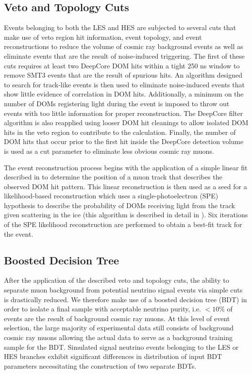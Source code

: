 \documentclass[manuscript]{aastex}
\begin{document}
\subsection{Veto and Topology Cuts}
Events belonging to both the LES and HES are subjected to several cuts that make use of veto region hit information, event topology, and event reconstructions to reduce the volume of cosmic ray background events as well as eliminate events that are the result of noise-induced triggering. The first of these cuts requires at least two DeepCore DOM hits within a tight 250 ns window to remove SMT3 events that are the result of spurious hits. An algorithm designed to search for track-like events is then used to eliminate noise-induced events that show little evidence of correlation in DOM hits. Additionally, a minimum on the number of DOMs registering light during the event is imposed to throw out events with too little information for proper reconstruction. The DeepCore filter algorithm is also reapplied using looser DOM hit cleanings to allow isolated DOM hits in the veto region to contribute to the calculation. Finally, the number of DOM hits that occur prior to the first hit inside the DeepCore detection volume is used as a cut parameter to eliminate less obvious cosmic ray muons.

The event reconstruction process begins with the application of a simple linear fit described in \cite{2014NIMPA.736..143A} to determine the position of a muon track that describes the observed DOM hit pattern. This linear reconstruction is then used as a seed for a likelihood-based reconstruction which uses a single-photoelectron (SPE) hypothesis to describe the probability of DOMs receiving light from the track given scattering in the ice (this algorithm is described in detail in \cite{2004NIMPA.524..169A}). Six iterations of the SPE likelihood reconstruction are performed to obtain a best-fit track for the event.
 
\subsection{Boosted Decision Tree}
After the application of the described veto and topology cuts, the ability to separate muon background from potential neutrino signal events via simple cuts is drastically reduced. We therefore make use of a boosted decision tree (BDT) in order to isolate a final sample with acceptable neutrino purity, i.e. $<10 \%$ of events are the result of background cosmic ray muons. At this level of event selection, the large majority of experimental data still consists of background cosmic ray muons allowing the actual data to serve as a background training sample for the BDT. Simulated signal neutrino events belonging to the LES or HES branches exhibit significant differences in distribution of input BDT parameters necessitating the construction of two separate BDTs. 
\end{document}
